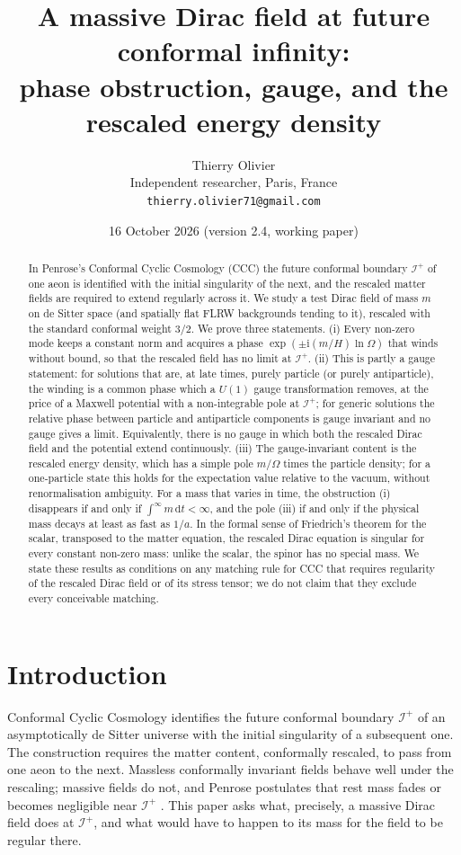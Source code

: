\documentclass[11pt,a4paper]{article}
\title{\textbf{A massive Dirac field at future conformal infinity:\\ phase obstruction, gauge, and the rescaled energy density}}
\author{Thierry Olivier\\ \small Independent researcher, Paris, France\\ \small \texttt{thierry.olivier71@gmail.com}}
\date{16 October 2026 \quad (version 2.4, working paper)}
\theoremstyle{definition}
\newcommand{\scri}{\mathscr{I}^{+}}
\newcommand{\dd}{\mathrm{d}}
\newcommand{\ii}{\mathrm{i}}
\begin{document}
\maketitle

\begin{abstract}
In Penrose's Conformal Cyclic Cosmology (CCC) the future conformal boundary $\scri$ of one aeon is identified with the initial singularity of the next, and the rescaled matter fields are required to extend regularly across it. We study a test Dirac field of mass $m$ on de Sitter space (and spatially flat FLRW backgrounds tending to it), rescaled with the standard conformal weight $3/2$. We prove three statements. (i) Every non-zero mode keeps a constant norm and acquires a phase $\exp(\pm\ii(m/H)\ln\Omega)$ that winds without bound, so that the rescaled field has no limit at $\scri$. (ii) This is partly a gauge statement: for solutions that are, at late times, purely particle (or purely antiparticle), the winding is a common phase which a $U(1)$ gauge transformation removes, at the price of a Maxwell potential with a non-integrable pole at $\scri$; for generic solutions the relative phase between particle and antiparticle components is gauge invariant and no gauge gives a limit. Equivalently, there is no gauge in which both the rescaled Dirac field and the potential extend continuously. (iii) The gauge-invariant content is the rescaled energy density, which has a simple pole $m/\Omega$ times the particle density; for a one-particle state this holds for the expectation value relative to the vacuum, without renormalisation ambiguity. For a mass that varies in time, the obstruction (i) disappears if and only if $\int^\infty m\,\dd t<\infty$, and the pole (iii) if and only if the physical mass decays at least as fast as $1/a$. In the formal sense of Friedrich's theorem for the scalar, transposed to the matter equation, the rescaled Dirac equation is singular for every constant non-zero mass: unlike the scalar, the spinor has no special mass. We state these results as conditions on any matching rule for CCC that requires regularity of the rescaled Dirac field or of its stress tensor; we do not claim that they exclude every conceivable matching.
\end{abstract}

\section{Introduction}

Conformal Cyclic Cosmology \cite{Penrose2010,Tod2013,MeissnerPenrose2025} identifies the future conformal boundary $\scri$ of an asymptotically de Sitter universe with the initial singularity of a subsequent one. The construction requires the matter content, conformally rescaled, to pass from one aeon to the next. Massless conformally invariant fields behave well under the rescaling; massive fields do not, and Penrose postulates that rest mass fades or becomes negligible near $\scri$ \cite{Penrose2010}. This paper asks what, precisely, a massive Dirac field does at $\scri$, and what would have to happen to its mass for the field to be regular there.
\end{document}
